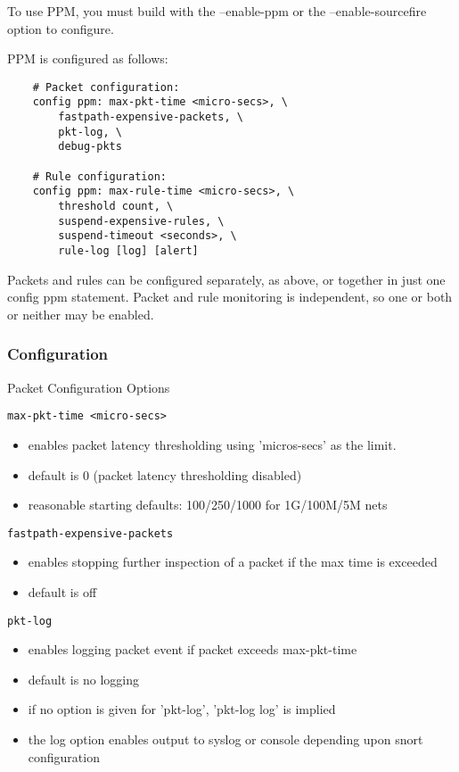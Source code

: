 \documentclass[english]{report}
\begin{document}
To use PPM, you must build with the --enable-ppm or the --enable-sourcefire
option to configure.

PPM is configured as follows:

\begin{verbatim}
    # Packet configuration:
    config ppm: max-pkt-time <micro-secs>, \
        fastpath-expensive-packets, \
        pkt-log, \
        debug-pkts
    
    # Rule configuration:
    config ppm: max-rule-time <micro-secs>, \
        threshold count, \
        suspend-expensive-rules, \
        suspend-timeout <seconds>, \
        rule-log [log] [alert]
\end{verbatim}

Packets and rules can be configured separately, as above, or together in just
one config ppm statement.  Packet and rule monitoring is independent, so one or
both or neither may be enabled.

\subsubsection{Configuration}

Packet Configuration Options

\texttt{max-pkt-time <micro-secs>}
\begin{itemize}
\item enables packet latency thresholding using 'micros-secs' as the limit.
\item default is 0 (packet latency thresholding disabled)
\item reasonable starting defaults: 100/250/1000 for 1G/100M/5M nets
\end{itemize}

\texttt{fastpath-expensive-packets}
\begin{itemize}
\item enables stopping further inspection of a packet if the max time is
      exceeded
\item default is off
\end{itemize}

\texttt{pkt-log}
\begin{itemize}
\item enables logging packet event if packet exceeds max-pkt-time
\item default is no logging
\item if no option is given for 'pkt-log', 'pkt-log log' is implied
\item the log option enables output to syslog or console depending 
      upon snort configuration
\end{itemize}
\end{document}
